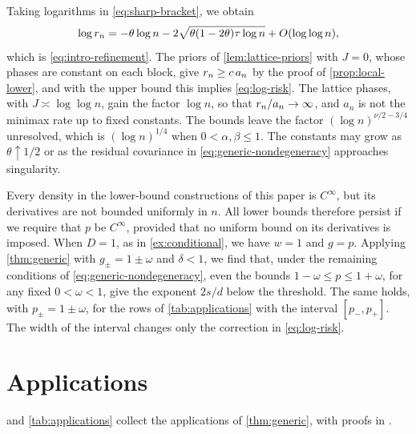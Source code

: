 \begin{remark}\label{rem:gap}
Taking logarithms in \eqref{eq:sharp-bracket}, we obtain
\begin{equation}\label{eq:log-risk}
 \log r_n=-\theta\log n
 -2\sqrt{\theta(1-2\theta)\tau\log n}+O(\log\log n),
\end{equation}
which is \eqref{eq:intro-refinement}. The priors of
\cref{lem:lattice-priors} with $J=0$, whose phases are constant on
each block, give $r_n\ge c\,a_n$ by the proof of
\cref{prop:local-lower}, and with the upper bound this
implies \eqref{eq:log-risk}. The lattice phases, with
$J\asymp\log\log n$, gain the factor $\log n$, so that
$r_n/a_n\to\infty$, and $a_n$ is not the minimax rate up to fixed
constants. The bounds leave the factor $(\log n)^{\nu/2-3/4}$
unresolved, which is $(\log n)^{1/4}$ when $0<\alpha,\beta\le1$. The
constants may grow as $\theta\uparrow1/2$ or as the residual covariance
in \eqref{eq:generic-nondegeneracy} approaches singularity.
\end{remark}

\begin{remark}
\label{rem:smooth-design}\label{rem:smooth-density}
Every density in the lower-bound constructions of this paper is
$C^\infty$, but its derivatives are not bounded uniformly in $n$. All
lower bounds therefore persist if we require that $p$ be $C^\infty$,
provided that no uniform bound on its derivatives is imposed. When
$D=1$, as in \cref{ex:conditional}, we have $w=1$ and $g=p$.
Applying \cref{thm:generic} with $g_\pm=1\pm\omega$ and
$\delta<1$, we find that, under the remaining conditions of
\eqref{eq:generic-nondegeneracy}, even the bounds
$1-\omega\le p\le1+\omega$, for any fixed $0<\omega<1$, give the
exponent $2s/d$ below the threshold. The same holds, with
$p_\pm=1\pm\omega$, for the rows of \cref{tab:applications} with
the interval $[p_-,p_+]$. The width of the interval changes only the
correction in \eqref{eq:log-risk}.
\end{remark}
\chapter{Applications}\label{sec:applications}

 and \cref{tab:applications} collect
the applications of \cref{thm:generic}, with proofs in
.

